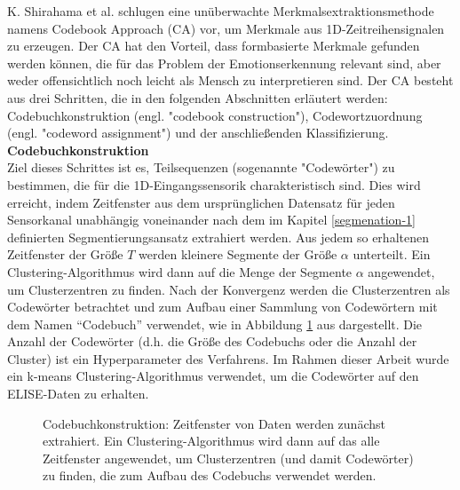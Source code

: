 K. Shirahama et al. \cite{kimiaki_codebook_approach_2016} schlugen eine unüberwachte Merkmalsextraktionsmethode namens Codebook Approach (CA) vor, um Merkmale aus 1D-Zeitreihensignalen zu erzeugen.
Der CA hat den Vorteil, dass formbasierte Merkmale gefunden werden können, die für das Problem der Emotionserkennung relevant sind, aber weder offensichtlich noch leicht als Mensch zu interpretieren sind. 
Der CA besteht aus drei Schritten, die in den folgenden Abschnitten erläutert werden: Codebuchkonstruktion (engl. "codebook construction"), Codewortzuordnung (engl. "codeword assignment") und der anschließenden Klassifizierung. \\


\textbf{Codebuchkonstruktion \\}
Ziel dieses Schrittes ist es, Teilsequenzen (sogenannte "Codewörter") zu bestimmen, die für die 1D-Eingangssensorik charakteristisch sind. 
Dies wird erreicht, indem Zeitfenster aus dem ursprünglichen Datensatz für jeden Sensorkanal unabhängig voneinander nach dem im Kapitel \ref{segmenation-1} definierten Segmentierungsansatz extrahiert werden.
Aus jedem so erhaltenen Zeitfenster der Größe $T$ werden kleinere Segmente der Größe $\alpha$ unterteilt.
Ein Clustering-Algorithmus wird dann auf die Menge der Segmente $\alpha$ angewendet, um Clusterzentren zu finden.
Nach der Konvergenz werden die Clusterzentren als Codewörter betrachtet und zum Aufbau einer Sammlung von Codewörtern mit dem Namen ``Codebuch'' verwendet, wie in Abbildung \ref{fig:ca_construction} aus \cite{kimiaki_codebook_approach_2016} dargestellt. 
Die Anzahl der Codewörter (d.h. die Größe des Codebuchs oder die Anzahl der Cluster) ist ein Hyperparameter des Verfahrens. Im Rahmen dieser Arbeit wurde ein k-means Clustering-Algorithmus verwendet, um die Codewörter auf den ELISE-Daten zu erhalten. \\


\begin{figure}[h]
\caption{ Codebuchkonstruktion: Zeitfenster von Daten werden zunächst extrahiert. Ein Clustering-Algorithmus wird dann auf das alle Zeitfenster angewendet, um Clusterzentren (und damit Codewörter) zu finden, die zum Aufbau des Codebuchs verwendet werden. }
\label{fig:ca_construction} \end{figure} \vspace{0.5cm}


